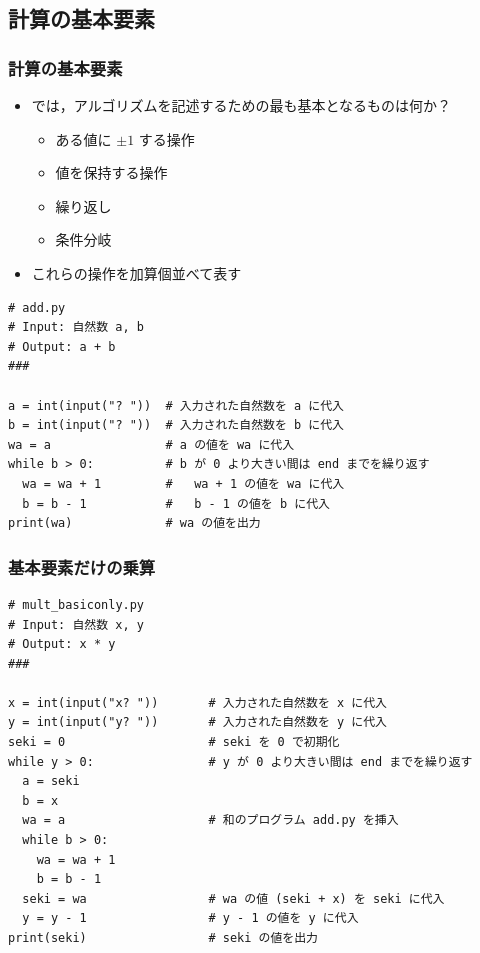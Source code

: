 \subsection{計算の基本要素}
\begin{frame}[fragile]
\frametitle{計算の基本要素}
  \begin{itemize}
\item では，アルゴリズムを記述するための最も基本となるものは何か？
    \begin{itemize}
\item ある値に \(\pm 1\) する操作
\item 値を保持する操作
\item 繰り返し
\item 条件分岐
    \end{itemize}
\item これらの操作を加算個並べて表す
  \end{itemize}
  \begin{lstlisting}[caption={加算},label=add]
# add.py
# Input: 自然数 a, b
# Output: a + b
###

a = int(input("? "))  # 入力された自然数を a に代入
b = int(input("? "))  # 入力された自然数を b に代入
wa = a                # a の値を wa に代入
while b > 0:          # b が 0 より大きい間は end までを繰り返す
  wa = wa + 1         #   wa + 1 の値を wa に代入
  b = b - 1           #   b - 1 の値を b に代入
print(wa)             # wa の値を出力
  \end{lstlisting}
\end{frame}
\begin{frame}[fragile,label=mult,shrink]
\frametitle{基本要素だけの乗算}
  \begin{lstlisting}[caption={乗算},label=lst:mult]
# mult_basiconly.py
# Input: 自然数 x, y
# Output: x * y
###

x = int(input("x? "))       # 入力された自然数を x に代入
y = int(input("y? "))       # 入力された自然数を y に代入
seki = 0                    # seki を 0 で初期化
while y > 0:                # y が 0 より大きい間は end までを繰り返す
  a = seki
  b = x
  wa = a                    # 和のプログラム add.py を挿入
  while b > 0:
    wa = wa + 1
    b = b - 1
  seki = wa                 # wa の値 (seki + x) を seki に代入
  y = y - 1                 # y - 1 の値を y に代入
print(seki)                 # seki の値を出力
  \end{lstlisting}
\hfill{\hyperlink{composit}{} \hyperlink{while}{}}
\end{frame}
